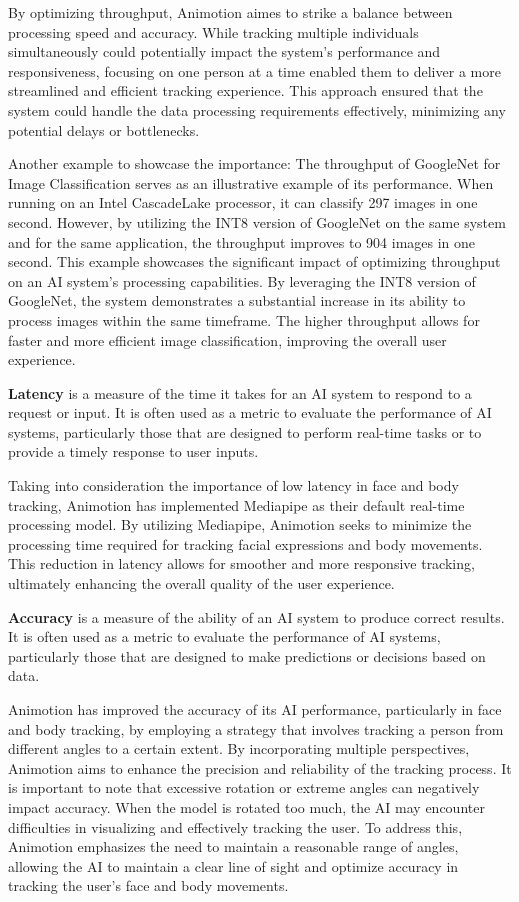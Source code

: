 By optimizing throughput, Animotion aimes to strike a balance between processing speed and accuracy. 
While tracking multiple individuals simultaneously could potentially impact the system's performance 
and responsiveness, focusing on one person at a time enabled them to deliver a more streamlined and 
efficient tracking experience. This approach ensured that the system could handle the data processing 
requirements effectively, minimizing any potential delays or bottlenecks.

Another example to showcase the importance: The throughput of GoogleNet for Image Classification serves as an illustrative example 
of its performance. When running on an Intel CascadeLake processor, it can classify 297 images in one second. 
However, by utilizing the INT8 version of GoogleNet on the same system and for the same application, 
the throughput improves to 904 images in one second.
This example showcases the significant impact of optimizing throughput on an 
AI system's processing capabilities. By leveraging the INT8 version of GoogleNet, 
the system demonstrates a substantial increase in its ability to process images 
within the same timeframe. The higher throughput allows for faster and more efficient image 
classification, improving the overall user experience.\cite{throughput}

\textbf{Latency} is a measure of the time it takes for an AI system to respond to a request or input.
It is often used as a metric to evaluate the performance of AI systems, particularly those that 
are designed to perform real-time tasks or to provide a timely response to user inputs.

Taking into consideration the importance of low latency in face and body tracking, 
Animotion has implemented Mediapipe as their default real-time processing model. 
By utilizing Mediapipe, Animotion seeks to minimize the processing time required for 
tracking facial expressions and body movements. This reduction in latency allows for smoother 
and more responsive tracking, ultimately enhancing the overall quality of the user experience.

\textbf{Accuracy} is a measure of the ability of an AI system to produce correct results.
It is often used as a metric to evaluate the performance of AI systems, particularly
those that are designed to make predictions or decisions based on data.


Animotion has improved the accuracy of its AI performance, particularly in face and body 
tracking, by employing a strategy that involves tracking a person from different angles 
to a certain extent. By incorporating multiple perspectives, Animotion aims to enhance the 
precision and reliability of the tracking process.
It is important to note that excessive rotation or extreme angles can negatively 
impact accuracy. When the model is rotated too much, the AI may encounter difficulties in 
visualizing and effectively tracking the user. To address this, Animotion emphasizes the 
need to maintain a reasonable range of angles, allowing the AI to maintain a clear line of 
sight and optimize accuracy in tracking the user's face and body movements.

